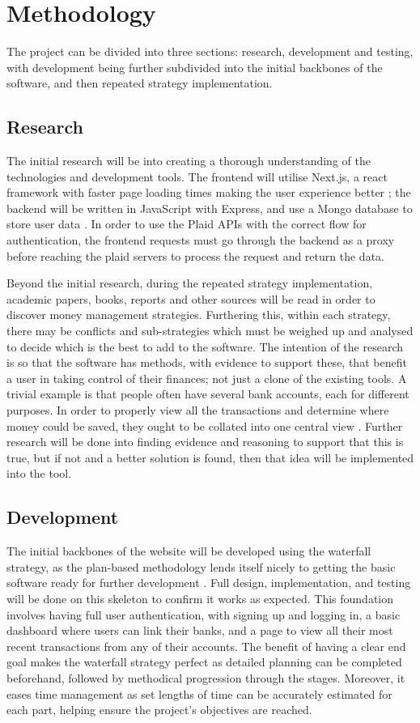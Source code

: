 \section{Methodology}
The project can be divided into three sections: research, development and testing, with development being further subdivided into the initial backbones of the software, and then repeated strategy implementation.


\subsection{Research}
The initial research will be into creating a thorough understanding of the technologies and development tools. The frontend will utilise Next.js, a react framework with faster page loading times making the user experience better \cite{NextJSSpeed}; the backend will be written in JavaScript with Express, and use a Mongo database to store user data \cite{MongoDB}. In order to use the Plaid APIs with the correct flow for authentication, the frontend requests must go through the backend as a proxy before reaching the plaid servers to process the request and return the data. 

Beyond the initial research, during the repeated strategy implementation, academic papers, books, reports and other sources will be read in order to discover money management strategies. Furthering this, within each strategy, there may be conflicts and sub-strategies which must be weighed up and analysed to decide which is the best to add to the software. The intention of the research is so that the software has methods, with evidence to support these, that benefit a user in taking control of their finances; not just a clone of the existing tools. A trivial example is that people often have several bank accounts, each for different purposes. In order to properly view all the transactions and determine where money could be saved, they ought to be collated into one central view \cite{HavingMultipleAccounts}. Further research will be done into finding evidence and reasoning to support that this is true, but if not and a better solution is found, then that idea will be implemented into the tool.

\subsection{Development}
The initial backbones of the website will be developed using the waterfall strategy, as the plan-based methodology lends itself nicely to getting the basic software ready for further development \cite{WaterfallVsAgile}. Full design, implementation, and testing will be done on this skeleton to confirm it works as expected. This foundation involves having full user authentication, with signing up and logging in, a basic dashboard where users can link their banks, and a page to view all their most recent transactions from any of their accounts. The benefit of having a clear end goal makes the waterfall strategy perfect as detailed planning can be completed beforehand, followed by methodical progression through the stages. Moreover, it eases time management as set lengths of time can be accurately estimated for each part, helping ensure the project's objectives are reached.


